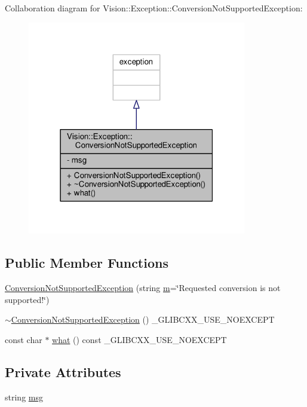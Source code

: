 Collaboration diagram for Vision\+:\+:Exception\+:\+:Conversion\+Not\+Supported\+Exception\+:\nopagebreak
\begin{figure}[H]
\begin{center}
\leavevmode
\includegraphics[width=271pt]{class_vision_1_1_exception_1_1_conversion_not_supported_exception__coll__graph}
\end{center}
\end{figure}
\subsection*{Public Member Functions}
\begin{DoxyCompactItemize}
\item 
\hyperlink{class_vision_1_1_exception_1_1_conversion_not_supported_exception_a34e253638a4c162ae5167caa24b291be}{Conversion\+Not\+Supported\+Exception} (string \hyperlink{_gen_blob_8m_ab3cd915d758008bd19d0f2428fbb354a}{m}=\char`\"{}Requested conversion is not supported!\char`\"{})
\item 
\hyperlink{class_vision_1_1_exception_1_1_conversion_not_supported_exception_a84a70ce59ae2c3c0e5482875b8fe502e}{$\sim$\+Conversion\+Not\+Supported\+Exception} () \+\_\+\+G\+L\+I\+B\+C\+X\+X\+\_\+\+U\+S\+E\+\_\+\+N\+O\+E\+X\+C\+E\+P\+T
\item 
const char $\ast$ \hyperlink{class_vision_1_1_exception_1_1_conversion_not_supported_exception_a1a19cac0a67a7db2e187aac55b06e4c2}{what} () const \+\_\+\+G\+L\+I\+B\+C\+X\+X\+\_\+\+U\+S\+E\+\_\+\+N\+O\+E\+X\+C\+E\+P\+T
\end{DoxyCompactItemize}
\subsection*{Private Attributes}
\begin{DoxyCompactItemize}
\item 
string \hyperlink{class_vision_1_1_exception_1_1_conversion_not_supported_exception_a1cd5dd7edfb67cf5055374402b846daa}{msg}
\end{DoxyCompactItemize}


